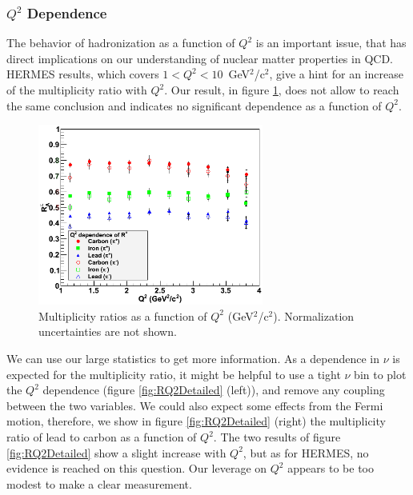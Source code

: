 \subsubsection{$Q^2$ Dependence}

The behavior of hadronization as a function of $Q^2$ is an important issue, that 
has direct implications on our understanding of nuclear matter properties in 
QCD. HERMES results, which covers $1<Q^2<10$~GeV$^2$/c$^2$, give a hint for an 
increase of the multiplicity ratio with $Q^2$. Our result, in figure 
\ref{fig:RQ2}, does not allow to reach the same conclusion and indicates no 
significant dependence as a function of $Q^2$.

\begin{figure}[tbp]
\centering
\includegraphics[width=7.4cm] {chap6-fig/F_RvQ2.png} 
\caption {Multiplicity ratios as a function of $Q^2$ (GeV$^2$/c$^2$). 
Normalization uncertainties are not shown.}
\label{fig:RQ2}
\end{figure}

We can use our large statistics to get more information. As 
a dependence in $\nu$ is expected for the multiplicity ratio, it might be helpful to use a tight 
$\nu$ bin to plot the $Q^2$ dependence (figure \ref{fig:RQ2Detailed} (left)), 
and remove any coupling between the two variables.
We could also expect some effects from the Fermi motion, 
therefore, we show in figure \ref{fig:RQ2Detailed} (right) the multiplicity ratio of lead to 
carbon as a function of $Q^2$. The two results of figure \ref{fig:RQ2Detailed} 
show a slight increase with $Q^2$, but as for HERMES, no evidence is 
reached on this question. Our leverage on $Q^2$ appears to be too modest
to make a clear measurement. 

